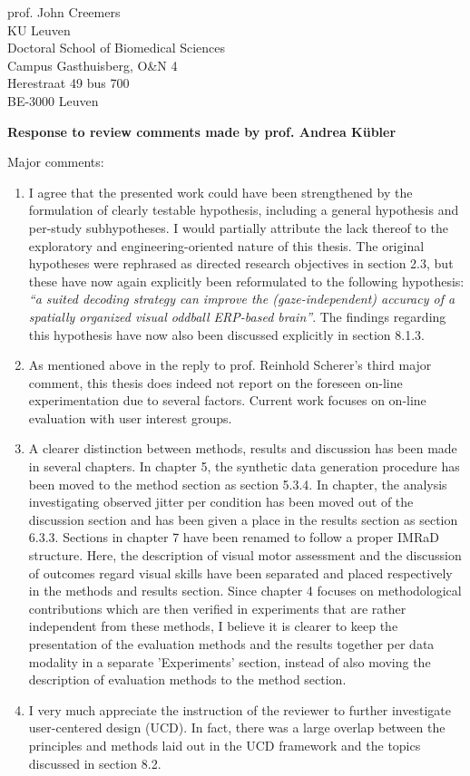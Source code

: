 \documentclass{letter}
\newcommand{\reply}[1]{%
	\textbf{Response to review comments made by prof. #1}

}
\begin{document}
\begin{letter}{%
	prof. John Creemers \\
	KU Leuven \\
	Doctoral School of Biomedical Sciences \\
	Campus Gasthuisberg, O\&N 4 \\
	Herestraat 49 bus 700 \\
	BE-3000 Leuven

}
\reply{Andrea K\"ubler}
Major comments:
\begin{enumerate}
  \item  I agree that the presented work could have been strengthened by the
  formulation of clearly testable hypothesis, including a general hypothesis
  and per-study subhypotheses.
  I would partially attribute the lack thereof to the exploratory and
  engineering-oriented nature of this thesis.
  The original hypotheses were rephrased as directed research objectives in
  section 2.3, but these have now again explicitly been reformulated to the
  following hypothesis: \emph{``a suited decoding strategy can improve the
    (gaze-independent) accuracy of a spatially organized visual oddball
    ERP-based brain''}.
  The findings regarding this hypothesis have now also been discussed
    explicitly in section 8.1.3.
  \item As mentioned above in the reply to prof. Reinhold Scherer's third major
    comment, this thesis does indeed not report on the foreseen on-line
    experimentation due to several factors.
    Current work focuses on on-line evaluation with user interest groups.
  \item
    A clearer distinction between methods, results and discussion has been made
    in several chapters.
    In chapter 5, the synthetic data generation procedure has been
    moved to the method section as section 5.3.4.
    In chapter, the analysis investigating observed jitter per condition has
    been moved out of the discussion section and has been given a place in the
    results section as section 6.3.3.
    Sections in chapter 7 have been renamed to follow a proper IMRaD structure.
    Here, the description of visual motor assessment and the
    discussion of outcomes regard visual skills have been separated and placed
    respectively in the methods and results section.
    Since chapter 4 focuses on methodological contributions which are then
    verified in experiments that are rather independent from these methods, I
    believe it is clearer to keep the presentation of the evaluation methods
    and the results together per data modality in a separate 'Experiments'
    section, instead of also moving the description of evaluation methods to
    the method section.
  \item I very much appreciate the instruction of the reviewer to further
    investigate user-centered design (UCD).
    In fact, there was a large overlap between the principles and methods laid
    out in the UCD framework and the topics discussed in section 8.2.

\end{enumerate}
\end{letter}
\end{document}
